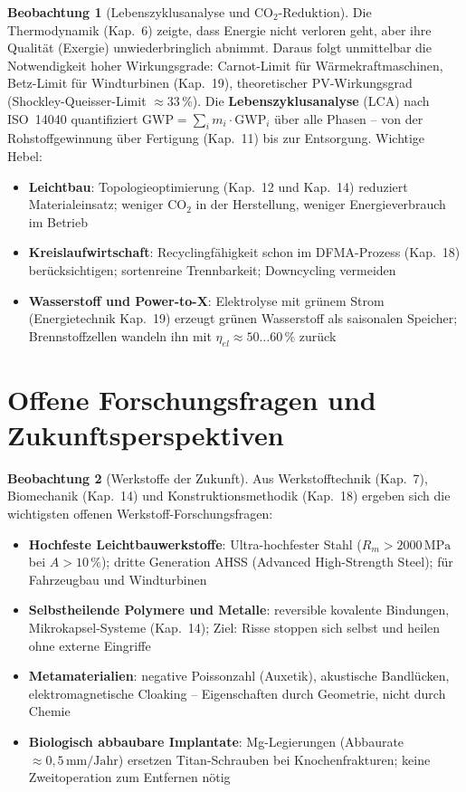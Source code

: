 ﻿\documentclass[a4paper,12pt]{report}
\theoremstyle{definition}
\newtheorem{beobachtung}{Beobachtung}
\begin{document}
\begin{beobachtung}[Lebenszyklusanalyse und CO$_2$-Reduktion]
Die Thermodynamik (Kap.~6) zeigte, dass Energie nicht verloren geht,
aber ihre Qualität (Exergie) unwiederbringlich abnimmt.
Daraus folgt unmittelbar die Notwendigkeit hoher Wirkungsgrade:
Carnot-Limit für Wärmekraftmaschinen, Betz-Limit für Windturbinen (Kap.~19),
theoretischer PV-Wirkungsgrad (Shockley-Queisser-Limit $\approx 33\,\%$).
Die \textbf{Lebenszyklus\-analyse} (LCA) nach ISO~14040 quantifiziert
$\mathrm{GWP} = \sum_i m_i \cdot \mathrm{GWP}_i$ über alle Phasen --
von der Rohstoffgewinnung über Fertigung (Kap.~11) bis zur Entsorgung.
Wichtige Hebel:
\begin{itemize}
    \item[-] \textbf{Leichtbau}: Topologieoptimierung (Kap.~12 und Kap.~14)
          reduziert Materialeinsatz; weniger CO$_2$ in der Herstellung,
          weniger Energieverbrauch im Betrieb
    \item[-] \textbf{Kreislaufwirtschaft}: Recyclingfähigkeit schon im DFMA-Prozess
          (Kap.~18) berücksichtigen; sortenreine Trennbarkeit; Downcycling vermeiden
    \item[-] \textbf{Wasserstoff und Power-to-X}: Elektrolyse mit grünem Strom
          (Energietechnik Kap.~19) erzeugt grünen Wasserstoff als saisonalen Speicher;
          Brennstoffzellen wandeln ihn mit $\eta_{el} \approx 50\ldots60\,\%$ zurück
\end{itemize}
\end{beobachtung}

\section{Offene Forschungsfragen und Zukunftsperspektiven}

\begin{beobachtung}[Werkstoffe der Zukunft]
Aus Werkstofftechnik (Kap.~7), Biomechanik (Kap.~14) und Konstruktionsmethodik (Kap.~18) ergeben sich die wichtigsten offenen Werkstoff-Forschungsfragen:
\begin{itemize}
    \item[-] \textbf{Hochfeste Leichtbauwerkstoffe}: Ultra-hochfester Stahl
          ($R_m > 2000\,\mathrm{MPa}$ bei $A > 10\,\%$); dritte Generation AHSS
          (Advanced High-Strength Steel); für Fahrzeugbau und Windturbinen
    \item[-] \textbf{Selbstheilende Polymere und Metalle}: reversible kovalente
          Bindungen, Mikrokapsel-Systeme (Kap.~14); Ziel: Risse stoppen
          sich selbst und heilen ohne externe Eingriffe
    \item[-] \textbf{Metamaterialien}: negative Poissonzahl (Auxetik),
          akustische Bandlücken, elektromagnetische Cloaking --
          Eigenschaften durch Geometrie, nicht durch Chemie
    \item[-] \textbf{Biologisch abbaubare Implantate}: Mg-Legierungen
          (Abbaurate $\approx 0{,}5\,\mathrm{mm/Jahr}$) ersetzen Titan-Schrauben
          bei Knochenfrakturen; keine Zweitoperation zum Entfernen nötig
\end{itemize}
\end{beobachtung}
\end{document}
